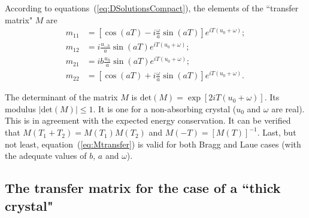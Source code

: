 \documentclass{iucr}
\begin{document}
According to equations~(\ref{eq:DSolutionsCompact}), the elements of the ``transfer matrix" $M$ are
\begin{subequations}\label{eq:MtransferElements}
\begin{align}
m_{11} &= \left[ \cos(aT)-i\frac{\omega}{a}\sin(aT) \right] e^{i T (u_0+\omega)};\\
m_{12} &= i \frac{u_{-h}}{a}\sin(aT) e^{i T (u_0+\omega)};\\
m_{21} &= i b \frac{u_h }{a} \sin(aT) e^{i T (u_0+\omega)};\\
m_{22} &= \left[ \cos(aT)+i \frac{\omega}{a}\sin(aT) \right] e^{i T (u_0+\omega)}.
\end{align}
\end{subequations}

The determinant of the matrix $M$ is 
$\text{det}(M)=\exp[2 i T (u_0+\omega)]$. Its modulus $|\text{det}(M)|\le 1$. It is one for a non-absorbing crystal ($u_0$ and $\omega$ are real).
This is in agreement with the expected energy conservation.
It can be verified that $M(T_1+T_2)=M(T_1) M(T_2)$ and $M(-T)=[M(T)]^{-1}$. Last, but not least, equation~(\ref{eq:Mtransfer}) is valid for both Bragg and Laue cases (with the adequate values of $b$, $a$ and $\omega$).

\subsection{The transfer matrix for the case of a ``thick crystal"}
\label{sec:Mthick}
\end{document}
